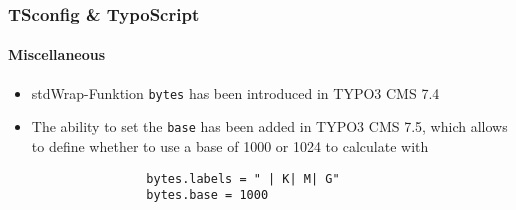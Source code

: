 \begin{frame}[fragile]
	\frametitle{TSconfig \& TypoScript}
	\framesubtitle{Miscellaneous}

	\begin{itemize}

		\item stdWrap-Funktion \texttt{bytes} has been introduced in TYPO3 CMS 7.4

		\item The ability to set the \texttt{base} has been added in TYPO3 CMS 7.5,
			which allows to define whether to use a base of 1000 or 1024 to calculate with

			\begin{lstlisting}
				bytes.labels = " | K| M| G"
				bytes.base = 1000
			\end{lstlisting}

	\end{itemize}

\end{frame}

